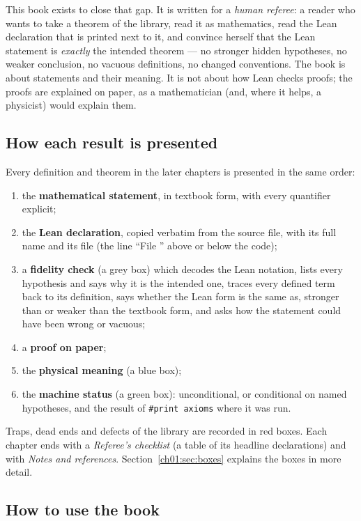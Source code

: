 This book exists to close that gap. It is written for a \emph{human referee}: a reader who wants
to take a theorem of the library, read it as mathematics, read the Lean declaration that is
printed next to it, and convince herself that the Lean statement is \emph{exactly} the intended
theorem --- no stronger hidden hypotheses, no weaker conclusion, no vacuous definitions, no changed
conventions. The book is about statements and their meaning. It is not about how Lean checks
proofs; the proofs are explained on paper, as a mathematician (and, where it helps, a physicist)
would explain them.

\subsection{How each result is presented}

Every definition and theorem in the later chapters is presented in the same order:
\begin{enumerate}
\item the \textbf{mathematical statement}, in textbook form, with every quantifier explicit;
\item the \textbf{Lean declaration}, copied verbatim from the source file, with its full name and
  its file (the line ``File '' above or below the code);
\item a \textbf{fidelity check} (a grey box) which decodes the Lean notation, lists every
  hypothesis and says why it is the intended one, traces every defined term back to its
  definition, says whether the Lean form is the same as, stronger than or weaker than the textbook
  form, and asks how the statement could have been wrong or vacuous;
\item a \textbf{proof on paper};
\item the \textbf{physical meaning} (a blue box);
\item the \textbf{machine status} (a green box): unconditional, or conditional on named
  hypotheses, and the result of \texttt{\#print axioms} where it was run.
\end{enumerate}
Traps, dead ends and defects of the library are recorded in red boxes. Each chapter ends with a
\emph{Referee's checklist} (a table of its headline declarations) and with \emph{Notes and
references}. Section~\ref{ch01:sec:boxes} explains the boxes in more detail.

\subsection{How to use the book}

